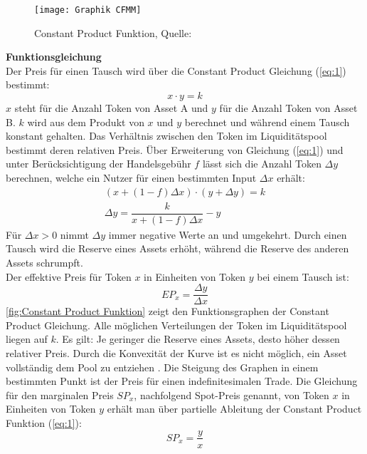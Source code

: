 \documentclass[12pt,a4paper,titlepage,oneside,english]{article}
\begin{document}
\begin{figure}[h!]
\begin{center}
\texttt{[image: Graphik CFMM]}
\caption{Constant Product Funktion, Quelle: \citet[S.10]{Schaer2020}}\label{fig:Constant Product Funktion}
\end{center}
\end{figure}

\textbf{Funktionsgleichung}\\
Der Preis für einen Tausch wird über die Constant Product Gleichung (\ref{eq:1}) bestimmt: \citep{Adams2020} 
\begin{equation}
x \cdot y = k \label{eq:1}
\end{equation}
$x$ steht für die Anzahl Token von Asset A und $y$ für die Anzahl Token von Asset B. $k$ wird aus dem Produkt von $x$ und $y$ berechnet und während einem Tausch konstant gehalten. Das Verhältnis zwischen den Token im Liquiditätspool bestimmt deren relativen Preis. Über Erweiterung von Gleichung (\ref{eq:1}) und unter Berücksichtigung der Handelsgebühr $f$ lässt sich die Anzahl Token $\Delta y$ berechnen, welche ein Nutzer für einen bestimmten Input $\Delta x$ erhält:
\begin{align}
(x+ (1-f)\Delta x)\cdot (y+ \Delta y) = k \\ 
\Delta y = \dfrac{k}{x+ (1-f) \Delta x} - y \label{eq:2+3}
\end{align}
Für $\Delta x>0$ nimmt $\Delta y$ immer negative Werte an und umgekehrt. Durch einen Tausch wird die Reserve eines Assets erhöht, während die Reserve des anderen Assets schrumpft. \citep[S.10]{Schaer2020}\\
Der effektive Preis für Token $x$ in Einheiten von Token $y$ bei einem Tausch ist: \citep{MartinelliMushegian2019}
\begin{equation}
EP_{x} = \dfrac{\Delta y}{\Delta x} \label{eq:4}
\end{equation}
\autoref{fig:Constant Product Funktion} zeigt den Funktionsgraphen der Constant Product Gleichung. Alle möglichen Verteilungen der Token im Liquiditätspool liegen auf $k$. Es gilt: Je geringer die Reserve eines Assets, desto höher dessen relativer Preis. Durch die Konvexität der Kurve ist es nicht möglich, ein Asset vollständig dem Pool zu entziehen \citep{Buterin2018}.
Die Steigung des Graphen in einem bestimmten Punkt ist der Preis für einen indefinitesimalen Trade. Die Gleichung für den marginalen Preis  $SP_{x}$, nachfolgend Spot-Preis genannt, von Token $x$ in Einheiten von Token $y$ erhält man über partielle Ableitung der Constant Product Funktion (\ref{eq:1}): \citep[S.4]{Angeris2019} %
\begin{equation}
SP_{x} = \dfrac{y}{x} \label{eq:5}
\end{equation}
\end{document}
